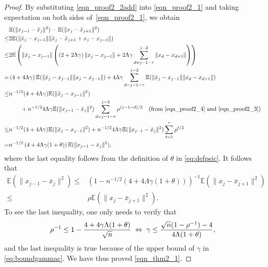 \documentclass{siamltex}
\begin{document}
\begin{proof}
By substituting \eqref{eqn_proof2_2add} into \eqref{eqn_proof2_1} and
taking expectation on both sides of~\eqref{eqn_proof2_1}, we obtain
\begin{align*}
&{\mathbb{E}}( \|x_{j-1}-\bar{x}_j\|^2) - {\mathbb{E}}(\|x_j-\bar{x}_{j+1}\|^2)\\
\leq & 2{\mathbb{E}}(\|\bar{x}_j -x_{j-1}\| \|\bar{x}_j-\bar{x}_{j+1}+x_j-x_{j-1}\|)\\
\leq & 2{\mathbb{E}}\left(\|\bar{x}_j -x_{j-1}\| \left(\left(2+2\Lambda\gamma\right)\|x_j-x_{j-1}\| + 2\Lambda\gamma \sum_{d=j-1-\tau}^{j-2} \|x_{d} -x_{d+1}\|\right)\right)\\
= & \left(4+4\Lambda\gamma\right){\mathbb{E}}(\|\bar{x}_j -x_{j-1}\| \|x_j-x_{j-1}\|) + 4\Lambda\gamma \sum_{d=j-1-\tau}^{j-2} {\mathbb{E}} (\|\bar{x}_j -x_{j-1}\|\|x_{d} -x_{d+1}\|) \\
\leq & n^{-1/2}(4+4\Lambda\gamma){\mathbb{E}}(\|\bar{x}_j-x_{j-1}\|^2) 
\\ 
&\quad \quad
+ n^{-1/2}4\Lambda\gamma{\mathbb{E}}(\|x_{j-1}-\bar{x}_j\|^2)\sum_{d=j-1-\tau}^{j-2}\rho^{(j-1-d)/2}
\quad(\text{from \eqref{eqn_proof2_4} and \eqref{eqn_proof2_3}}) \\
\leq & n^{-1/2}(4+4\Lambda\gamma){\mathbb{E}}(\|\bar{x}_j-x_{j-1}\|^2) + n^{-1/2}4\Lambda\gamma{\mathbb{E}}(\|x_{j-1}-\bar{x}_j\|^2)\sum_{t=1}^{\tau}\rho^{t/2}\\
= & n^{-1/2}\left(4+4\Lambda\gamma(1+\theta)\right) {\mathbb{E}} (\|{x}_{j-1}-\bar{x}_j\|^2),
\end{align*}
where the last equality follows from the definition of $\theta$ in \eqref{eq:defpsic}. It follows that
\begin{align*}
{\mathbb{E}}(\|x_{j-1}-\bar{x}_j\|^2) \leq & \left(1-n^{-1/2}\left(4+4\Lambda\gamma(1+\theta)\right)\right)^{-1} {\mathbb{E}}
(\|x_j-\bar{x}_{j+1}\|^2)  \\
\leq &
\rho {\mathbb{E}} (\|x_j-\bar{x}_{j+1}\|^2).
\end{align*}
To see the last inequality, one only needs to verify that
\[
\rho^{-1} \leq 1-{4+{4\gamma \Lambda(1+\theta)}\over \sqrt{n}} \;
\Leftrightarrow \;  \gamma \leq \frac{\sqrt{n}(1-\rho^{-1}) - 4}{4\Lambda(1+\theta)},
\]
and the last inequality is true because of the upper bound of $\gamma$
in \eqref{eq:boundgammac}.  We have thus proved \eqref{eqn_thm2_1}.


\end{proof}
\end{document}
